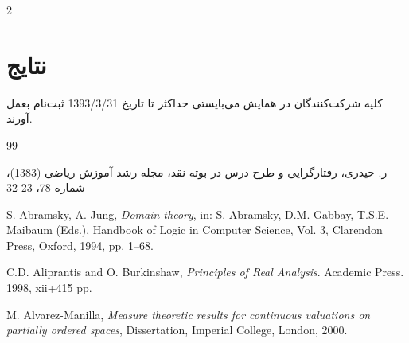 \documentclass[a4paper,10pt]{article}
\begin{document}
\begin{multicols}{2}
\section*{نتایج}

کلیه شرکت‌کنندگان در همایش می‌بایستی حداکثر تا تاریخ 1393/3/31 ثبت‌نام بعمل آورند. 



\begin{thebibliography}{99}

\bibitem{}

ر. حیدری، رفتارگرایی و طرح درس در بوته نقد، مجله رشد آموزش ریاضی (1383)، شماره 78، 23-32

\begin{LTRitems}

\resetlatinfont

S. Abramsky, A. Jung, {\em Domain theory}, in: S. Abramsky, D.M. Gabbay, T.S.E. Maibaum (Eds.), Handbook of
Logic in Computer Science, Vol. 3, Clarendon Press, Oxford, 1994, pp. 1–68.

C.D. Aliprantis and O. Burkinshaw,   {\em Principles of Real Analysis}.  Academic Press.  1998,  xii+415 pp.

M. Alvarez-Manilla, {\em Measure theoretic results for continuous valuations on partially ordered
spaces}, Dissertation, Imperial College, London, 2000.


\end{LTRitems}

\end{thebibliography}


\end{multicols}
\end{document}

